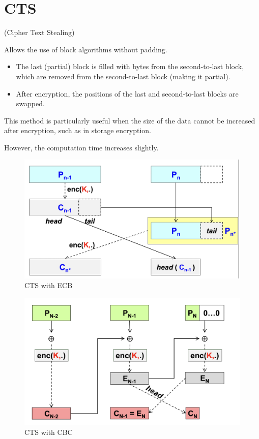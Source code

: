 \section{CTS}
\begin{center}
    (Cipher Text Stealing)
\end{center}
Allows the use of block algorithms without padding.
\begin{itemize}
\item The last (partial) block is filled with bytes from the second-to-last block, which are removed from the second-to-last block (making it partial).
\item After encryption, the positions of the last and second-to-last blocks are swapped.
\end{itemize}
This method is particularly useful when the size of the data cannot be increased after encryption, such as in storage encryption.

However, the computation time increases slightly.

\begin{multicols}{2}

    \begin{figure}[H]
        \centering
        \includegraphics[width=\linewidth]{Images/Cryptography/CTS_ECB.png}
        \caption{CTS with ECB}
    \end{figure}

    \columnbreak

    \begin{figure}[H]
        \centering
        \includegraphics[width=\linewidth]{Images/Cryptography/CTS_CBC.png}
        \caption{CTS with CBC}
    \end{figure}
    
\end{multicols}